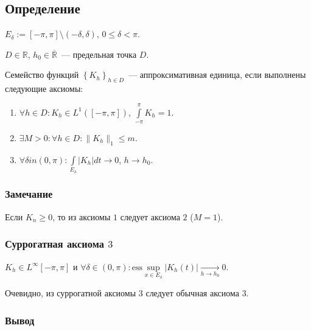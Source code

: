 \documentclass{article}
\begin{document}
    \subsection{Определение}
    
        $E_{\delta} := [-\pi, \pi] \setminus (-\delta, \delta)$, $0 \leqslant \delta < \pi$.
               
            $D \in \mathbb{R}$, $h_0 \in \overline{\mathbb{R}}$~--- предельная точка $D$.
            
            Семейство функций $\left\{ K_h \right\}_{h \in D}$~--- аппроксимативная единица, если выполнены следующие аксиомы:
            
            \begin{enumerate}
            
                \item $\forall h \in D : K_h \in L^1 ([-\pi, \pi])$, $\int\limits^{\pi}_{-\pi} K_h = 1$.
                
                \item $\exists M > 0 : \forall h \in D : \| K_h \|_1 \leqslant m$.
                
                \item $\forall \delta in (0, \pi) : \int\limits_{E_{\delta}} | K_h | dt \rightarrow 0$, $h \rightarrow h_0$.
                
            \end{enumerate}
            
            \subsubsection{Замечание}
            
                Если $K_n \geqslant 0$, то из аксиомы $1$ следует аксиома $2$ ($M = 1$).
                
            \subsubsection{Суррогатная аксиома $3$}
            
                $K_h \in L^{\infty} [-\pi, \pi]$ и $\forall \delta \in (0, \pi) : \mathrm{ess}\sup\limits_{x \in E_{\delta}} \left| K_h(t) \right| \xrightarrow[h \rightarrow h_0]{} 0$.
                
                Очевидно, из суррогатной аксиомы $3$ следует обычная аксиома $3$.
            
            \subsubsection{Вывод}
            
\end{document}
